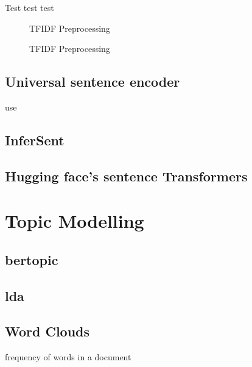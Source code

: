 \cite{tfidf2020}
Test test test
\begin{figure}[h] %
    \centering
    
    \caption{TFIDF Preprocessing}
    \label{fig:tfidf_embedding}
\end{figure}

\begin{figure}[htp] %
    \centering
    
    \caption{TFIDF Preprocessing}
    \label{fig:preprocessing}
\end{figure}

\subsection{Universal sentence encoder}\label{subsec:univ-sent-encoder}
\ac{use}
\cite{UniversalSentEnc2018}

\subsection{InferSent}\label{subsec:inferSent}
\cite{inferSent2018}

\subsection{Hugging face's sentence Transformers}\label{subsec:hf-sent-ransformers}
\cite{HfsentTrans2019}


\section{Topic Modelling}\label{sec:topic-modelling}

\subsection{\ac{bertopic}}\label{subsec:bertopic}

\subsection{\ac{lda}}\label{subsec:latent-dirichlet-allocation}

\subsection{Word Clouds}\label{subsec:word-clouds}
frequency of words in a document


